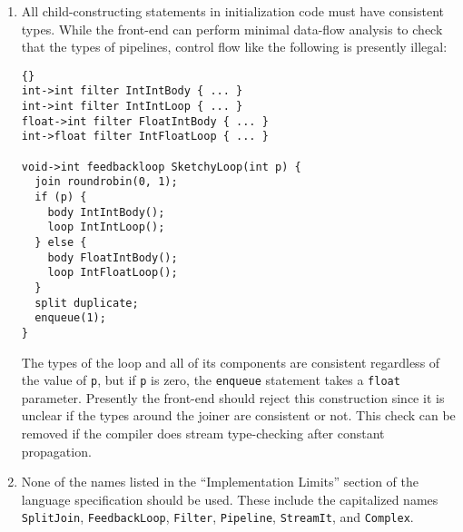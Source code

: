 \documentclass[11pt]{article}
\begin{document}
\begin{enumerate}
\item All child-constructing statements in initialization code must
  have consistent types.  While the front-end can perform minimal
  data-flow analysis to check that the types of pipelines, control
  flow like the following is presently illegal:

\begin{lstlisting}{}
int->int filter IntIntBody { ... }
int->int filter IntIntLoop { ... }
float->int filter FloatIntBody { ... }
int->float filter IntFloatLoop { ... }

void->int feedbackloop SketchyLoop(int p) {
  join roundrobin(0, 1);
  if (p) {
    body IntIntBody();
    loop IntIntLoop();
  } else {
    body FloatIntBody();
    loop IntFloatLoop();
  }
  split duplicate;
  enqueue(1);
}
\end{lstlisting}

  The types of the loop and all of its components are consistent
  regardless of the value of \lstinline|p|, but if \lstinline|p| is
  zero, the \lstinline|enqueue| statement takes a \lstinline|float|
  parameter.  Presently the front-end should reject this construction
  since it is unclear if the types around the joiner are consistent or
  not.  This check can be removed if the compiler does stream
  type-checking after constant propagation.
\item None of the names listed in the ``Implementation Limits''
  section of the language specification should be used.  These include
  the capitalized names \lstinline|SplitJoin|,
  \lstinline|FeedbackLoop|, \lstinline|Filter|, \lstinline|Pipeline|,
  \lstinline|StreamIt|, and \lstinline|Complex|.
\end{enumerate}
\end{document}
